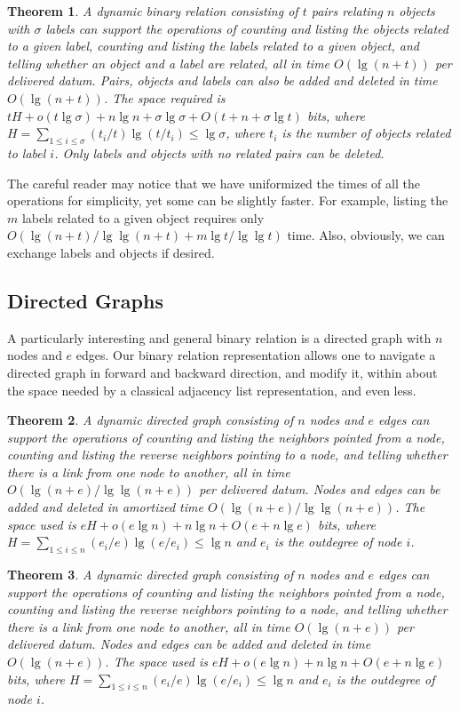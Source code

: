 \documentclass[11pt]{article}
\newtheorem{theorem}{Theorem}
\begin{document}
\begin{theorem} \label{thm:binrelwc}
A dynamic binary relation consisting of $t$ pairs relating $n$ objects 
with $\sigma$ labels can support the operations of 
counting and listing the objects 
related to a given label, counting and listing the labels related to a given 
object, and telling whether an object and a label are related, all in time 
$O(\lg (n+t))$ per delivered datum. Pairs, objects 
and labels can also be added and deleted in time 
$O(\lg (n+t))$. The space required is 
$tH + o(t\lg\sigma)+n\lg n+\sigma\lg \sigma+ O(t+n+\sigma\lg t)$ bits,
where $H=\sum_{1 \le i \le \sigma} (t_i/t)\lg(t/t_i)
\le \lg\sigma$, where $t_i$ is the number of objects related to label $i$.
Only labels and objects with no related pairs can be deleted.
\end{theorem}

The careful reader may notice that we have uniformized the times of all the
operations for simplicity, yet some can be slightly faster. For example,
listing the $m$ labels related to a given object requires only
$O(\lg(n+t)/\lg\lg(n+t)+m\lg t/\lg\lg t)$ time. Also, obviously, we can
exchange labels and objects if desired.

\subsection{Directed Graphs} 

A particularly interesting and general binary
relation is a directed graph with $n$ nodes and $e$ edges. Our binary relation
representation allows one to navigate a directed graph in forward and backward 
direction, and modify it, within about the space needed by a classical
adjacency list representation, and even less.

\begin{theorem}
A dynamic directed graph consisting of $n$ nodes and $e$ edges 
can support the operations of counting and listing the neighbors pointed from 
a node, counting and listing the reverse neighbors pointing to a node, and 
telling whether there is a link from one node to another, all in time 
$O(\lg (n+e) / \lg\lg (n+e))$ per delivered datum. Nodes and edges 
can be added and deleted in amortized time 
$O(\lg (n+e) / \lg\lg (n+e))$. The space used is 
$eH + o(e\lg n) + n\lg n + O(e+n\lg e)$ bits, 
where $H=\sum_{1 \le i \le n} (e_i/e)\lg(e/e_i) \le \lg n$
and $e_i$ is the outdegree of node $i$.
\end{theorem}

\begin{theorem}
A dynamic directed graph consisting of $n$ nodes and $e$ edges 
can support the operations of counting and listing the neighbors pointed from 
a node, counting and listing the reverse neighbors pointing to a node, and 
telling whether there is a link from one node to another, all in time 
$O(\lg (n+e))$ per delivered datum. Nodes and edges 
can be added and deleted in time 
$O(\lg (n+e))$. The space used is 
$eH + o(e\lg n) + n\lg n + O(e+n\lg e)$ bits, 
where $H=\sum_{1 \le i \le n} (e_i/e)\lg(e/e_i) \le \lg n$
and $e_i$ is the outdegree of node $i$.
\end{theorem}
\end{document}
